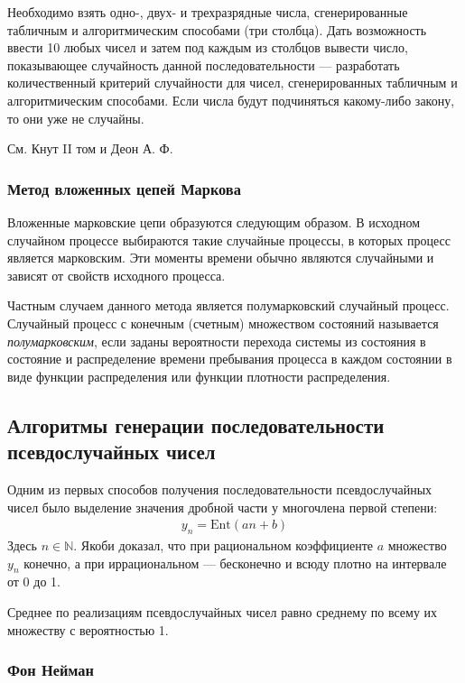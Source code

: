 Необходимо взять одно-, двух- и трехразрядные числа, сгенерированные табличным и алгоритмическим способами (три столбца). Дать возможность ввести 10 любых чисел и затем под каждым из столбцов вывести число, показывающее случайность данной последовательности --- разработать количественный критерий случайности для чисел, сгенерированных табличным и алгоритмическим способами. Если числа будут подчиняться какому-либо закону, то они уже не случайны.

См. Кнут II том и Деон А. Ф.

\subsubsection{Метод вложенных цепей Маркова}

Вложенные марковские цепи образуются следующим образом. В исходном случайном процессе выбираются такие случайные процессы, в которых процесс является марковским. Эти моменты времени обычно являются случайными и зависят от свойств исходного процесса.

Частным случаем данного метода является полумарковский случайный процесс. Случайный процесс с конечным (счетным) множеством состояний называется \textit{полумарковским}, если заданы вероятности перехода системы из состояния в состояние и распределение времени пребывания процесса в каждом состоянии в виде функции распределения или функции плотности распределения.

\subsection{Алгоритмы генерации последовательности псевдослучайных чисел}

Одним из первых способов получения последовательности псевдослучайных чисел было выделение значения дробной части у многочлена первой степени:
%
\begin{gather*}
    y_n = \text{Ent}(an+b)
\end{gather*}
%
Здесь $n\in\mathbb{N}$. Якоби доказал, что при рациональном коэффициенте $a$ множество $y_n$ конечно, а при иррациональном --- бесконечно и всюду плотно на интервале от 0 до 1.

Среднее по реализациям псевдослучайных чисел равно среднему по всему их множеству с вероятностью 1.

\subsubsection{Фон Нейман}

